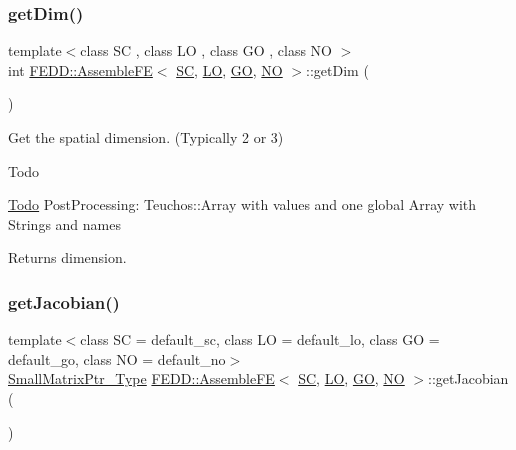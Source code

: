 \subsubsection{\texorpdfstring{get\+Dim()}{getDim()}}
{\footnotesize\ttfamily template$<$class SC , class LO , class GO , class NO $>$ \\
int \hyperlink{classFEDD_1_1AssembleFE}{F\+E\+D\+D\+::\+Assemble\+FE}$<$ \hyperlink{fe__test__laplace_8cpp_a79c7e86a57edbb2a5a53242bcd04e41e}{SC}, \hyperlink{fe__test__laplace_8cpp_ad6a38c9f07d3fd633eefca5bccad8410}{LO}, \hyperlink{fe__test__laplace_8cpp_afa2946b509009b4f45eb04bd8c5b27d9}{GO}, \hyperlink{fe__test__laplace_8cpp_a5e24f37b28787429872b6ecb1d0417ce}{NO} $>$\+::get\+Dim (\begin{DoxyParamCaption}{ }\end{DoxyParamCaption})}



Get the spatial dimension. (Typically 2 or 3) 

\begin{DoxyRefDesc}{Todo}
\item[\hyperlink{todo__todo000003}{Todo}]Post\+Processing\+: Teuchos\+::\+Array with values and one global Array with Strings and names \end{DoxyRefDesc}


\begin{DoxyReturn}{Returns}
dimension. 
\end{DoxyReturn}
\mbox{\label{classFEDD_1_1AssembleFE_af7fb8c5ae1f77eca6e8c7e887ea761ec}} 
\subsubsection{\texorpdfstring{get\+Jacobian()}{getJacobian()}}
{\footnotesize\ttfamily template$<$class SC  = default\+\_\+sc, class LO  = default\+\_\+lo, class GO  = default\+\_\+go, class NO  = default\+\_\+no$>$ \\
\hyperlink{classFEDD_1_1AssembleFE_afb5fb5dca3aab59f697a25884e99e894}{Small\+Matrix\+Ptr\+\_\+\+Type} \hyperlink{classFEDD_1_1AssembleFE}{F\+E\+D\+D\+::\+Assemble\+FE}$<$ \hyperlink{fe__test__laplace_8cpp_a79c7e86a57edbb2a5a53242bcd04e41e}{SC}, \hyperlink{fe__test__laplace_8cpp_ad6a38c9f07d3fd633eefca5bccad8410}{LO}, \hyperlink{fe__test__laplace_8cpp_afa2946b509009b4f45eb04bd8c5b27d9}{GO}, \hyperlink{fe__test__laplace_8cpp_a5e24f37b28787429872b6ecb1d0417ce}{NO} $>$\+::get\+Jacobian (\begin{DoxyParamCaption}{ }\end{DoxyParamCaption})\hspace{0.3cm}{\ttfamily [inline]}}



